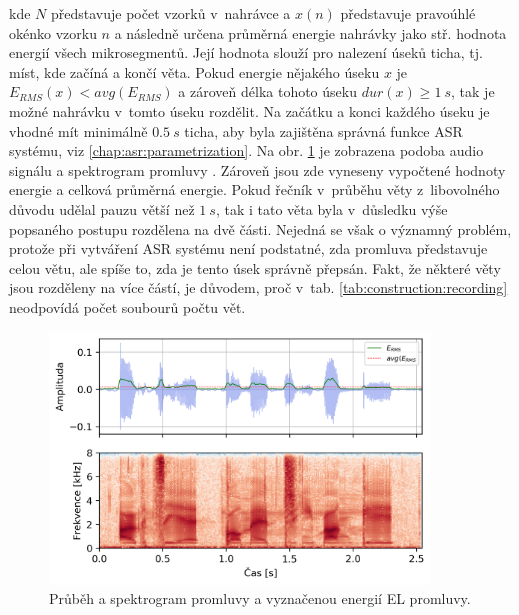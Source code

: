 \noindent kde $N$ představuje počet vzorků v~nahrávce a $x(n)$ představuje pravoúhlé okénko vzorku $n$ a následně určena průměrná energie nahrávky jako stř. hodnota energií všech mikrosegmentů.
Její hodnota slouží pro nalezení úseků ticha, tj. míst, kde začíná a končí věta.
Pokud energie nějakého úseku $x$ je $E_{RMS}(x) < avg(E_{RMS})$ a zároveň délka tohoto úseku $dur(x) \geq 1\ s$, tak je možné nahrávku v~tomto úseku rozdělit. Na začátku a konci každého úseku je vhodné mít minimálně $0.5\ s$ ticha, aby byla zajištěna správná funkce ASR systému, viz \ref{chap:asr:parametrization}.
Na obr. \ref{fig:construction:el_speech} je zobrazena podoba audio signálu a spektrogram promluvy \textit{}.
Zároveň jsou zde vyneseny vypočtené hodnoty energie a celková průměrná energie.
Pokud řečník v~průběhu věty z~libovolného důvodu udělal pauzu větší než $1\ s$, tak i tato věta byla v~důsledku výše popsaného postupu rozdělena na dvě části.
Nejedná se však o významný problém, protože při vytváření ASR systému není podstatné, zda promluva představuje celou větu, ale spíše to, zda je tento úsek správně přepsán.
Fakt, že některé věty jsou rozděleny na více částí, je důvodem, proč v~tab. \ref{tab:construction:recording} neodpovídá počet soubourů počtu vět.

\begin{figure}[hbpt]
  \centering
  \includegraphics[width=0.9\textwidth]{./ch5-construction/img/energy_spec_el.png}
  \caption[Průběh a spektrogram EL promluvy.]{Průběh a spektrogram promluvy a vyznačenou energií EL promluvy.}
  \label{fig:construction:el_speech}
\end{figure}


